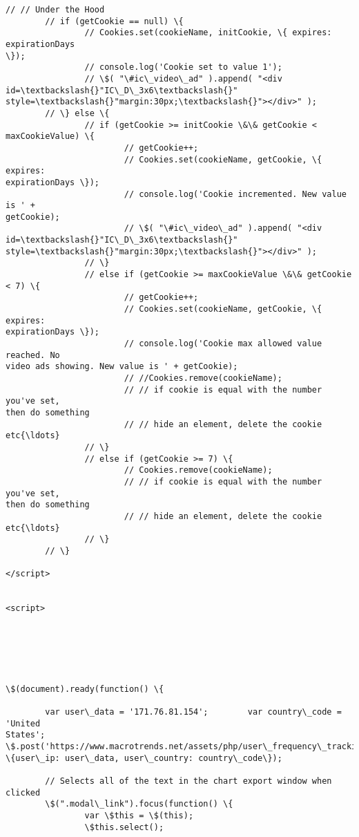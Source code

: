 \documentclass[11pt]{article}
\begin{document}
\begin{Verbatim}[commandchars=\\\{\}]
        // // Under the Hood
        // if (getCookie == null) \{
                // Cookies.set(cookieName, initCookie, \{ expires: expirationDays
\});
                // console.log('Cookie set to value 1');
                // \$( "\#ic\_video\_ad" ).append( "<div id=\textbackslash{}"IC\_D\_3x6\textbackslash{}"
style=\textbackslash{}"margin:30px;\textbackslash{}"></div>" );
        // \} else \{
                // if (getCookie >= initCookie \&\& getCookie < maxCookieValue) \{
                        // getCookie++;
                        // Cookies.set(cookieName, getCookie, \{ expires:
expirationDays \});
                        // console.log('Cookie incremented. New value is ' +
getCookie);
                        // \$( "\#ic\_video\_ad" ).append( "<div id=\textbackslash{}"IC\_D\_3x6\textbackslash{}"
style=\textbackslash{}"margin:30px;\textbackslash{}"></div>" );
                // \}
                // else if (getCookie >= maxCookieValue \&\& getCookie < 7) \{
                        // getCookie++;
                        // Cookies.set(cookieName, getCookie, \{ expires:
expirationDays \});
                        // console.log('Cookie max allowed value reached. No
video ads showing. New value is ' + getCookie);
                        // //Cookies.remove(cookieName);
                        // // if cookie is equal with the number you've set,
then do something
                        // // hide an element, delete the cookie etc{\ldots}
                // \}
                // else if (getCookie >= 7) \{
                        // Cookies.remove(cookieName);
                        // // if cookie is equal with the number you've set,
then do something
                        // // hide an element, delete the cookie etc{\ldots}
                // \}
        // \}

</script>


<script>






\$(document).ready(function() \{

        var user\_data = '171.76.81.154';        var country\_code = 'United
States';
\$.post('https://www.macrotrends.net/assets/php/user\_frequency\_tracking.php',
\{user\_ip: user\_data, user\_country: country\_code\});

        // Selects all of the text in the chart export window when clicked
        \$(".modal\_link").focus(function() \{
                var \$this = \$(this);
                \$this.select();


\end{Verbatim}
\end{document}
